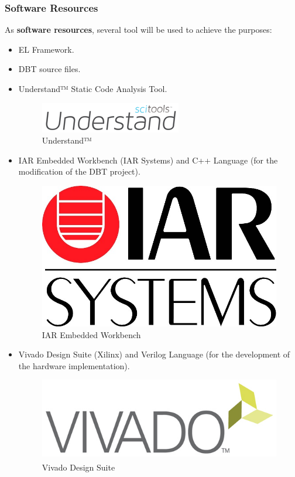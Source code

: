 \subsubsection{Software Resources}
As \textbf{software resources}, several tool will be used to achieve the purposes: 
\begin{itemize}
\item EL Framework.
\item DBT source files.
\end{itemize}


\begin{itemize}
\item Understand™ Static Code Analysis Tool.

\begin{figure}[!htb]
\centering
\includegraphics[scale=0.5]{images/Understand_logo}
\caption{Understand™}
\label{fig:Understand_logo} 
\end{figure}

\item IAR Embedded Workbench (IAR Systems) and C++ Language (for the modification of the DBT project).

\begin{figure}[!htb]
\centering
\includegraphics[scale=0.15]{images/IAR}
\caption{IAR Embedded Workbench }
\label{fig:IAR_logo} 
\end{figure}

\item Vivado Design Suite (Xilinx) and Verilog Language (for the development of the hardware implementation).

\begin{figure}[!htb]
\centering
\includegraphics[scale=0.2]{images/vivado_logo}
\caption{Vivado\textsuperscript{\textregistered} Design Suite}
\label{fig:Vivado_logo} 
\end{figure}


\end{itemize}
